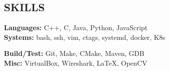\documentclass[centered]{res} %
\begin{document}
\begin{resume}
\section{SKILLS}
\vspace{0pt}
\begin{multicols}{2}
	\textbf{Languages:} C++, C, Java, Python, JavaScript \\
	\textbf{Systems:} bash, ssh, vim, ctags, systemd, docker, K8s \\
	
	\columnbreak
	
	\textbf{Build/Test:} Git, Make, CMake, Maven, GDB \\
	\textbf{Misc:} VirtualBox, Wireshark, LaTeX, OpenCV \\
\end{multicols}

\end{resume}
\end{document}
